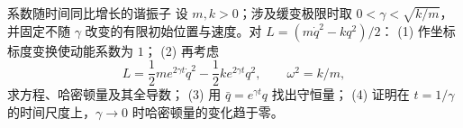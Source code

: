 \begin{advexamplebox}{系数随时间同比增长的谐振子}\label{advA1:ex:scaled-oscillator}
设 $m,k>0$；涉及缓变极限时取 $0<\gamma<\sqrt{k/m}$，并固定不随 $\gamma$ 改变的有限初始位置与速度。对 $L=(m\dot q^2-kq^2)/2$：
(1) 作坐标标度变换使动能系数为 $1$；
(2) 再考虑
\[
 L=\frac12me^{2\gamma t}\dot q^2-\frac12ke^{2\gamma t}q^2,
 \qquad \omega^2=k/m,
\]
求方程、哈密顿量及其全导数；
(3) 用 $\bar q=e^{\gamma t}q$ 找出守恒量；
(4) 证明在 $t=1/\gamma$ 的时间尺度上，$\gamma\to0$ 时哈密顿量的变化趋于零。

\begin{qualityfigure}
\label{advA1:fig:quality-scaled-oscillator-q}
\end{qualityfigure}
\end{advexamplebox}
